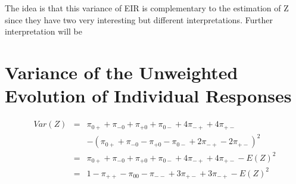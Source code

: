 \documentclass[12pt,a4paper,oneside]{book}
\begin{document}
The idea is that this variance of EIR is complementary to the estimation of Z since they have two very interesting but different interpretations.
Further interpretation will be 

\section{Variance of the Unweighted Evolution of Individual Responses}




\begin{eqnarray}
Var(Z) &=& \pi_{0+} + \pi_{-0} + \pi_{+0} + \pi_{0-} +4\pi_{-+} +4\pi_{+-} \nonumber \nonumber \\ 
&&	- (\pi_{0+} + \pi_{-0} - \pi_{+0} - \pi_{0-} +2\pi_{-+} -2\pi_{+-})^2 \nonumber \\
&=& \pi_{0+} + \pi_{-0} + \pi_{+0} + \pi_{0-} +4\pi_{-+} +4\pi_{+-} - E(Z)^2 \nonumber \\
&=& 1 - \pi_{++} - \pi_{00} - \pi_{--} + 3\pi_{+-} + 3\pi_{-+} - E(Z)^2
\end{eqnarray}
\end{document}
